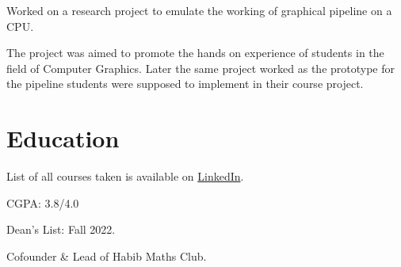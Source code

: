 \documentclass[]{resume}
\begin{document}
\begin{minipage}[t]{0.5\textwidth}
    \begin{tightemize}
        \sectionsep
        \item Worked on a research project to emulate the working of graphical pipeline on a CPU.
        \item The project was aimed to promote the hands on experience of students in the field of Computer Graphics. Later the same project worked as the prototype for the pipeline students were supposed to implement in their course project.
    \end{tightemize}


    \section{Education}
     
    \begin{tightemize}
        \sectionsep
        \item List of all courses taken is available on \href{https://www.linkedin.com/in/meesumaliqazalbash/details/courses/}{LinkedIn}.
        \item CGPA: 3.8/4.0
        \item Dean's List: Fall 2022.
        \item Cofounder \& Lead of Habib Maths Club.
    \end{tightemize}


\end{minipage}
\end{document}
